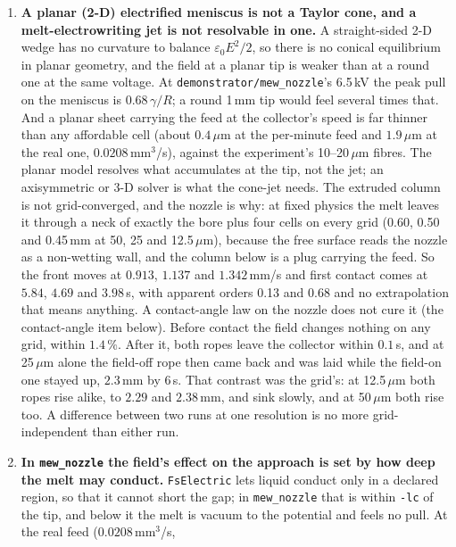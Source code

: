 \documentclass[11pt,a4paper]{article}
\newcommand{\code}[1]{\texttt{\small #1}}
\begin{document}
\begin{enumerate}[leftmargin=1.4em,itemsep=4pt]
  \code{mew\_nozzle}'s nozzle it turns a diverging ladder into a slowly
  converging one (the pinned-neck item below). 3-D is untested.
\item \textbf{A planar (2-D) electrified meniscus is not a Taylor cone, and a
  melt-electrowriting jet is not resolvable in one.} A straight-sided 2-D wedge
  has no curvature to balance $\varepsilon_0E^2/2$, so there is no conical
  equilibrium in planar geometry, and the field at a planar tip is weaker than
  at a round one at the same voltage. At \code{demonstrator/mew\_nozzle}'s
  6.5\,kV the peak pull on the meniscus is $0.68\,\gamma/R$; a round
  1\,mm tip would feel several times that. And a planar sheet carrying the feed
  at the collector's speed is far thinner than any affordable cell (about
  $0.4\,\mu$m at the per-minute feed and $1.9\,\mu$m at the real one,
  $0.0208\,$mm$^3$/s), against the experiment's 10--20\,$\mu$m fibres. The planar model resolves what accumulates at the
  tip, not the jet; an axisymmetric or 3-D solver is what the cone-jet needs.
  The extruded column is not grid-converged, and the nozzle is why: at fixed
  physics the melt leaves it through a neck of exactly the bore plus four cells
  on every grid (0.60, 0.50 and 0.45\,mm at 50, 25 and 12.5\,$\mu$m), because
  the free surface reads the nozzle as a non-wetting wall, and the column below
  is a plug carrying the feed. So the front moves at $0.913$, $1.137$ and
  $1.342$\,mm/s and first contact comes at $5.84$, $4.69$ and $3.98$\,s, with
  apparent orders 0.13 and 0.68 and no extrapolation that means anything. A
  contact-angle law on the nozzle does not cure it (the contact-angle item
  below). Before
  contact the field changes nothing on any grid, within $1.4\,\%$. After it,
  both ropes leave the collector within $0.1$\,s, and at 25\,$\mu$m alone the
  field-off rope then came back and was laid while the field-on one stayed up,
  $2.3$\,mm by $6$\,s. That contrast was the grid's: at 12.5\,$\mu$m both ropes
  rise alike, to $2.29$ and $2.38$\,mm, and sink slowly, and at 50\,$\mu$m both
  rise too. A difference between two runs at one resolution is no more
  grid-independent than either run.
\item \textbf{In \code{mew\_nozzle} the field's effect on the approach is set by
  how deep the melt may conduct.} \code{FsElectric} lets liquid conduct only
  in a declared region, so that it cannot short the gap; in \code{mew\_nozzle}
  that is within \code{-lc} of the tip, and below it the melt is vacuum to the
  potential and feels no pull. At the real feed ($0.0208\,$mm$^3$/s,

\end{enumerate}
\end{document}
